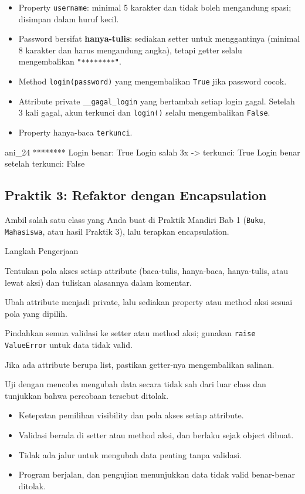 \begin{itemize}
  \item Property \texttt{username}: minimal 5 karakter dan tidak boleh mengandung spasi; disimpan dalam huruf kecil.
  \item Password bersifat \textbf{hanya-tulis}: sediakan setter untuk menggantinya (minimal 8 karakter dan harus mengandung angka), tetapi getter selalu mengembalikan \texttt{"********"}.
  \item Method \texttt{login(password)} yang mengembalikan \texttt{True} jika password cocok.
  \item Attribute private \texttt{\_\_gagal\_login} yang bertambah setiap login gagal. Setelah 3 kali gagal, akun terkunci dan \texttt{login()} selalu mengembalikan \texttt{False}.
  \item Property hanya-baca \texttt{terkunci}.
\end{itemize}

\begin{keluaran}
ani_24 ********
Login benar: True
Login salah 3x -> terkunci: True
Login benar setelah terkunci: False
\end{keluaran}

\subsection{Praktik 3: Refaktor dengan Encapsulation}

Ambil salah satu class yang Anda buat di Praktik Mandiri Bab 1 (\texttt{Buku}, \texttt{Mahasiswa}, atau hasil Praktik 3), lalu terapkan encapsulation.

\begin{langkah}{Langkah Pengerjaan}
  \item Tentukan pola akses setiap attribute (baca-tulis, hanya-baca, hanya-tulis, atau lewat aksi) dan tuliskan alasannya dalam komentar.
  \item Ubah attribute menjadi private, lalu sediakan property atau method aksi sesuai pola yang dipilih.
  \item Pindahkan semua validasi ke setter atau method aksi; gunakan \texttt{raise ValueError} untuk data tidak valid.
  \item Jika ada attribute berupa list, pastikan getter-nya mengembalikan salinan.
  \item Uji dengan mencoba mengubah data secara tidak sah dari luar class dan tunjukkan bahwa percobaan tersebut ditolak.
\end{langkah}

\begin{penting}
\begin{itemize}
  \item Ketepatan pemilihan visibility dan pola akses setiap attribute.
  \item Validasi berada di setter atau method aksi, dan berlaku sejak object dibuat.
  \item Tidak ada jalur untuk mengubah data penting tanpa validasi.
  \item Program berjalan, dan pengujian menunjukkan data tidak valid benar-benar ditolak.
\end{itemize}
\end{penting}
